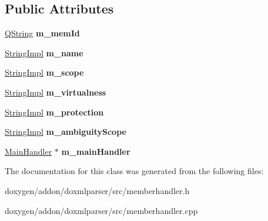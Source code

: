 \subsection*{Public Attributes}
\begin{DoxyCompactItemize}
\item 
\mbox{\label{class_member_reference_a9c0cae213f1647442e29a9ad1f56833d}} 
\mbox{\hyperlink{class_q_string}{Q\+String}} {\bfseries m\+\_\+mem\+Id}
\item 
\mbox{\label{class_member_reference_adc9c0013ea80b42b6283986c60e8b3bc}} 
\mbox{\hyperlink{class_string_impl}{String\+Impl}} {\bfseries m\+\_\+name}
\item 
\mbox{\label{class_member_reference_ab3ee8bae0bc0127e774321768c5416f4}} 
\mbox{\hyperlink{class_string_impl}{String\+Impl}} {\bfseries m\+\_\+scope}
\item 
\mbox{\label{class_member_reference_ab6a5f4ea5553c90f401e9994be7350b0}} 
\mbox{\hyperlink{class_string_impl}{String\+Impl}} {\bfseries m\+\_\+virtualness}
\item 
\mbox{\label{class_member_reference_a6edbce27f90770bfae829ee386f762d6}} 
\mbox{\hyperlink{class_string_impl}{String\+Impl}} {\bfseries m\+\_\+protection}
\item 
\mbox{\label{class_member_reference_acb3dbf8396675977f99c59561ae029c9}} 
\mbox{\hyperlink{class_string_impl}{String\+Impl}} {\bfseries m\+\_\+ambiguity\+Scope}
\item 
\mbox{\label{class_member_reference_af5befae31231dbf94dab5ad7e0567217}} 
\mbox{\hyperlink{class_main_handler}{Main\+Handler}} $\ast$ {\bfseries m\+\_\+main\+Handler}
\end{DoxyCompactItemize}


The documentation for this class was generated from the following files\+:\begin{DoxyCompactItemize}
\item 
doxygen/addon/doxmlparser/src/memberhandler.\+h\item 
doxygen/addon/doxmlparser/src/memberhandler.\+cpp\end{DoxyCompactItemize}
